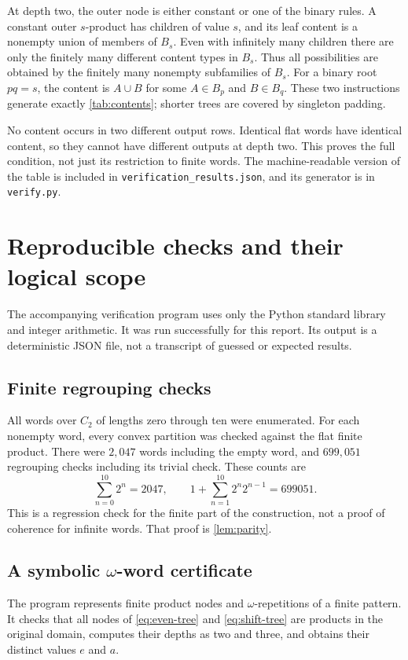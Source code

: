 \documentclass[11pt,letterpaper]{article}
\numberwithin{equation}{section}
\theoremstyle{definition}
\theoremstyle{remark}
\begin{document}
At depth two, the outer node is either constant or one of the binary rules. A constant outer $s$-product has children of value $s$, and its leaf content is a nonempty union of members of $B_s$. Even with infinitely many children there are only the finitely many different content types in $B_s$. Thus all possibilities are obtained by the finitely many nonempty subfamilies of $B_s$. For a binary root $pq=s$, the content is $A\cup B$ for some $A\in B_p$ and $B\in B_q$. These two instructions generate exactly \cref{tab:contents}; shorter trees are covered by singleton padding.

No content occurs in two different output rows. Identical flat words have identical content, so they cannot have different outputs at depth two. This proves the full condition, not just its restriction to finite words. The machine-readable version of the table is included in \texttt{verification\_results.json}, and its generator is in \texttt{verify.py}.

\section{Reproducible checks and their logical scope}
\label{sec:checks}
The accompanying verification program uses only the Python standard library and integer arithmetic. It was run successfully for this report. Its output is a deterministic JSON file, not a transcript of guessed or expected results.

\subsection{Finite regrouping checks}
All words over $C_2$ of lengths zero through ten were enumerated. For each nonempty word, every convex partition was checked against the flat finite product. There were $2{,}047$ words including the empty word, and $699{,}051$ regrouping checks including its trivial check. These counts are
\[
\sum_{n=0}^{10}2^n=2047,
\qquad
1+\sum_{n=1}^{10}2^n2^{n-1}=699051.
\]
This is a regression check for the finite part of the construction, not a proof of coherence for infinite words. That proof is \cref{lem:parity}.

\subsection{A symbolic $\omega$-word certificate}
The program represents finite product nodes and $\omega$-repetitions of a finite pattern. It checks that all nodes of \eqref{eq:even-tree} and \eqref{eq:shift-tree} are products in the original domain, computes their depths as two and three, and obtains their distinct values $e$ and $a$.
\end{document}
